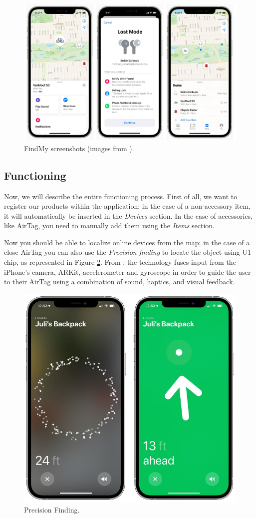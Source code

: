 \documentclass[english]{article}
\begin{document}
\begin{figure}[t]
	\centering
	\includegraphics[width=.9\textwidth]{images/findmy.jpg}
	\caption{FindMy screenshots (images from \cite{findmyscreen}).}
	\label{findmy2}
\end{figure}

\subsection{Functioning}
Now, we will describe the entire functioning process. First of all, we want to register our products within the application; in the case of a non-accessory item, it will automatically be inserted in the \textit{Devices} section. In the case of accessories, like AirTag, you need to manually add them using the \textit{Items} section.

Now you should be able to localize online devices from the map; in the case of a close AirTag you can also use the \textit{Precision finding} to locate the object using U1 chip, as represented in Figure \ref{findmy1}. From \cite{OBoyle_2021}: the technology fuses input from the iPhone's camera, ARKit, accelerometer and gyroscope in order to guide the user to their AirTag using a combination of sound, haptics, and visual feedback. 

\begin{figure}[t]
	\centering
	\includegraphics[width=.6\textwidth]{images/airtag-precision-finding-2.jpg}
	\caption{Precision Finding.}
	\label{findmy1}
\end{figure}
\end{document}
